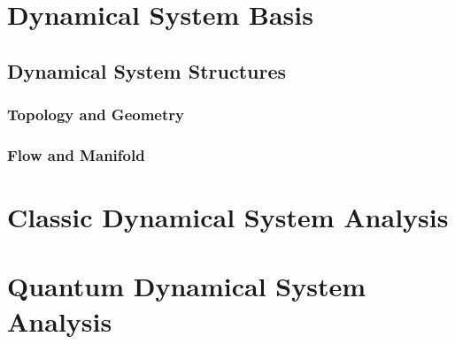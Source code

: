 
\chapter{Dynamical System Basis}
\section{Dynamical System Structures}
\subsection{Topology and Geometry}
\subsection{Flow and Manifold}


\chapter{Classic Dynamical System Analysis}

\chapter{Quantum Dynamical System Analysis}


